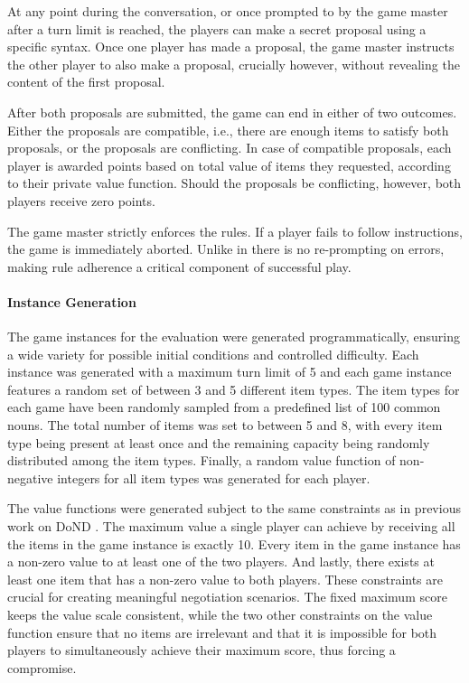 At any point during the conversation, or once prompted to by the game master after a turn limit is reached, the players can make a secret proposal using a specific syntax. Once one player has made a proposal, the game master instructs the other player to also make a proposal, crucially however, without revealing the content of the first proposal.

After both proposals are submitted, the game can end in either of two outcomes. Either the proposals are compatible, i.e., there are enough items to satisfy both proposals, or the proposals are conflicting. In case of compatible proposals, each player is awarded points based on total value of items they requested, according to their private value function. Should the proposals be conflicting, however, both players receive zero points.

The game master strictly enforces the rules. If a player fails to follow instructions, the game is immediately aborted. Unlike in \cite{DBLP:journals/corr/abs-2406-18872} there is no re-prompting on errors, making rule adherence a critical component of successful play.


\paragraph{Instance Generation}

The game instances for the evaluation were generated programmatically, ensuring a wide variety for possible initial conditions and controlled difficulty. Each instance was generated with a maximum turn limit of 5 and each game instance features a random set of between 3 and 5 different item types. The item types for each game have been randomly sampled from a predefined list of 100 common nouns. The total number of items was set to between 5 and 8, with every item type being present at least once and the remaining capacity being randomly distributed among the item types. Finally, a random value function of non-negative integers for all item types was generated for each player.

The value functions were generated subject to the same constraints as in previous work on DoND \cite{DBLP:journals/corr/abs-2406-18872,lewis-etal-2017-deal}. The maximum value a single player can achieve by receiving all the items in the game instance is exactly 10. Every item in the game instance has a non-zero value to at least one of the two players. And lastly, there exists at least one item that has a non-zero value to both players.
These constraints are crucial for creating meaningful negotiation scenarios. The fixed maximum score keeps the value scale consistent, while the two other constraints on the value function ensure that no items are irrelevant and that it is impossible for both players to simultaneously achieve their maximum score, thus forcing a compromise.

